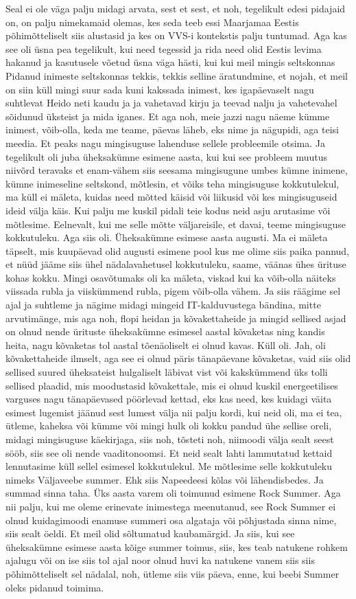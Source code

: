 Seal ei ole väga palju midagi arvata, sest et sest, et noh, tegelikult edesi pidajaid on, on palju nimekamaid olemas, kes seda teeb essi Maarjamaa Eestis põhimõtteliselt siis alustasid ja kes on VVS-i kontekstis palju tuntumad. Aga kas see oli üsna pea tegelikult, kui need tegessid ja rida need olid Eestis levima hakanud ja kasutusele võetud üsna väga hästi, kui kui meil mingis seltskonnas
Pidanud inimeste seltskonnas tekkis, tekkis selline äratundmine, et nojah, et meil on siin küll mingi suur sada kuni kakssada inimest, kes igapäevaselt nagu suhtlevat Heido neti kaudu ja ja vahetavad kirju ja teevad nalju ja vahetevahel sõidunud üksteist ja mida iganes. Et aga noh, meie jazzi nagu näeme kümme inimest, võib-olla, keda me teame, päevas läheb, eks nime ja nägupidi, aga teisi meedia. Et peaks nagu mingisuguse lahenduse sellele probleemile otsima. Ja tegelikult oli juba üheksakümne esimene aasta, kui kui see probleem muutus niivõrd teravaks et enam-vähem siis seesama mingisugune umbes kümne inimene, kümne inimeseline seltskond, mõtlesin, et võiks teha mingisuguse kokkutulekul, ma küll ei mäleta, kuidas need mõtted käisid või liikusid või kes mingisuguseid ideid välja käis. Kui palju me kuskil pidali teie kodus neid asju arutasime või mõtlesime. Eelnevalt, kui me selle mõtte väljareisile, et davai, teeme mingisuguse kokkutuleku. Aga siis oli.
Üheksakümne esimese aasta augusti. Ma ei mäleta täpselt, mis kuupäevad olid augusti esimene pool kus me olime siis paika pannud, et nüüd jääme siis ühel nädalavahetusel kokkutuleku, saame, väänas ühes ürituse kohas kokku. Mingi osavõtumaks oli ka mäleta, viskad kui ka võib-olla näiteks viissada rubla ja viiskümmend rubla, pigem võib-olla vähem. Ja siis räägime sel ajal ja suhtleme ja nägime midagi mingeid IT-kalduvustega bändina, mitte arvutimänge, mis aga noh, flopi heidan ja kõvakettaheide ja mingid sellised asjad on olnud nende ürituste üheksakümne esimesel aastal kõvaketas ning kandis heita, nagu kõvaketas tol aastal tõenäoliselt ei olnud kavas. Küll oli.
Jah, oli kõvakettaheide ilmselt, aga see ei olnud päris tänapäevane kõvaketas, vaid siis olid sellised suured üheksateist hulgaliselt läbivat vist või kakskümmend üks tolli sellised plaadid, mis moodustasid kõvakettale, mis ei olnud kuskil energeetilises varguses nagu tänapäevased pöörlevad kettad, eks kas need, kes kuidagi väita esimest lugemist jäänud sest lumest välja nii palju kordi, kui neid oli, ma ei tea, ütleme, kaheksa või kümme või mingi hulk oli kokku pandud ühe sellise oreli, midagi mingisuguse käekirjaga, siis noh, tõsteti noh, niimoodi välja sealt seest sööb, siis see oli nende vaaditonoomsi. Et neid sealt lahti lammutatud kettaid lennutasime küll sellel esimesel kokkutulekul. Me mõtlesime selle kokkutuleku nimeks Väljaveebe summer. Ehk siis Napeedeesi kõlas või lähendisbedes. Ja summad sinna taha. Üks aasta varem oli toimunud esimene Rock Summer. Aga nii palju, kui me oleme erinevate inimestega meenutanud, see Rock Summer ei olnud kuidagimoodi enamuse summeri osa algataja või põhjustada sinna nime, siis sealt öeldi. Et meil olid sõltumatud kaubamärgid. Ja siis, kui see üheksakümne esimese aasta kõige summer toimus, siis, kes teab natukene rohkem ajalugu või on ise siis tol ajal noor olnud huvi ka natukene vanem siis siis põhimõtteliselt sel nädalal, noh, ütleme siis viis päeva, enne, kui beebi Summer oleks pidanud toimima.
